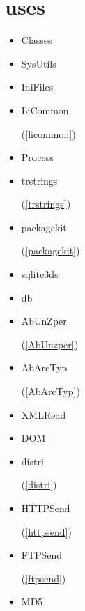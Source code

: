 \documentclass{report}
\begin{document}
\section{uses}
\begin{itemize}
\item \begin{ttfamily}Classes\end{ttfamily}\item \begin{ttfamily}SysUtils\end{ttfamily}\item \begin{ttfamily}IniFiles\end{ttfamily}\item \begin{ttfamily}LiCommon\end{ttfamily}(\ref{licommon})\item \begin{ttfamily}Process\end{ttfamily}\item \begin{ttfamily}trstrings\end{ttfamily}(\ref{trstrings})\item \begin{ttfamily}packagekit\end{ttfamily}(\ref{packagekit})\item \begin{ttfamily}sqlite3ds\end{ttfamily}\item \begin{ttfamily}db\end{ttfamily}\item \begin{ttfamily}AbUnZper\end{ttfamily}(\ref{AbUnzper})\item \begin{ttfamily}AbArcTyp\end{ttfamily}(\ref{AbArcTyp})\item \begin{ttfamily}XMLRead\end{ttfamily}\item \begin{ttfamily}DOM\end{ttfamily}\item \begin{ttfamily}distri\end{ttfamily}(\ref{distri})\item \begin{ttfamily}HTTPSend\end{ttfamily}(\ref{httpsend})\item \begin{ttfamily}FTPSend\end{ttfamily}(\ref{ftpsend})\item \begin{ttfamily}MD5\end{ttfamily}\end{itemize}
\end{document}
